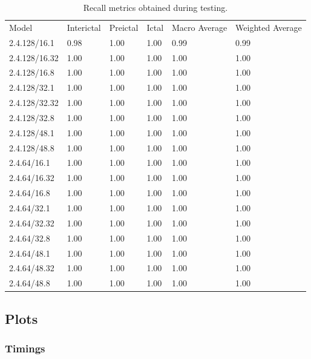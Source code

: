 \documentclass[12pt]{article}
\begin{document}
\begin{table}[H]
\centering
\begin{tabular}{llllll}
Model & Interictal & Preictal & Ictal & Macro Average & Weighted Average \\
 2.4.128/16.1 & 0.98 & 1.00 & 1.00 & 0.99 & 0.99 \\
 2.4.128/16.32 & 1.00 & 1.00 & 1.00 & 1.00 & 1.00 \\
 2.4.128/16.8 & 1.00 & 1.00 & 1.00 & 1.00 & 1.00 \\
 2.4.128/32.1 & 1.00 & 1.00 & 1.00 & 1.00 & 1.00 \\
 2.4.128/32.32 & 1.00 & 1.00 & 1.00 & 1.00 & 1.00 \\
 2.4.128/32.8 & 1.00 & 1.00 & 1.00 & 1.00 & 1.00 \\
 2.4.128/48.1 & 1.00 & 1.00 & 1.00 & 1.00 & 1.00 \\
 2.4.128/48.8 & 1.00 & 1.00 & 1.00 & 1.00 & 1.00 \\
 2.4.64/16.1 & 1.00 & 1.00 & 1.00 & 1.00 & 1.00 \\
 2.4.64/16.32 & 1.00 & 1.00 & 1.00 & 1.00 & 1.00 \\
 2.4.64/16.8 & 1.00 & 1.00 & 1.00 & 1.00 & 1.00 \\
 2.4.64/32.1 & 1.00 & 1.00 & 1.00 & 1.00 & 1.00 \\
 2.4.64/32.32 & 1.00 & 1.00 & 1.00 & 1.00 & 1.00 \\
 2.4.64/32.8 & 1.00 & 1.00 & 1.00 & 1.00 & 1.00 \\
 2.4.64/48.1 & 1.00 & 1.00 & 1.00 & 1.00 & 1.00 \\
 2.4.64/48.32 & 1.00 & 1.00 & 1.00 & 1.00 & 1.00 \\
 2.4.64/48.8 & 1.00 & 1.00 & 1.00 & 1.00 & 1.00 \\
\end{tabular}
\caption{Recall metrics obtained during testing.}
\label{tab:recall-metrics}
\end{table}






\subsection{Plots}

\subsubsection{Timings}
\end{document}
